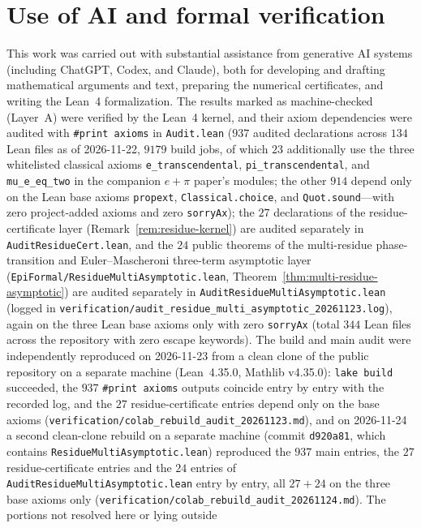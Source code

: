 \documentclass[11pt]{article}
\theoremstyle{definition}
\theoremstyle{remark}
\begin{document}
\section*{Use of AI and formal verification}
This work was carried out with substantial assistance from generative AI
systems (including ChatGPT, Codex, and Claude), both for developing and drafting
mathematical arguments and text, preparing the numerical certificates, and
writing the Lean~4 formalization. The results marked as machine-checked (Layer~A)
were verified by the Lean~4 kernel, and their axiom dependencies were audited
with \texttt{\#print axioms} in \texttt{Audit.lean} ($937$ audited declarations
across $134$ Lean files as of 2026-11-22, $9179$ build jobs, of which $23$ additionally use the three whitelisted classical
axioms \texttt{e\_transcendental}, \texttt{pi\_transcendental}, and
\texttt{mu\_e\_eq\_two} in the companion $e+\pi$ paper's modules; the other $914$
depend only on the Lean base axioms \texttt{propext}, \texttt{Classical.choice},
and \texttt{Quot.sound}---with zero
project-added axioms and zero \texttt{sorryAx}); the $27$ declarations of the
residue-certificate layer (Remark~\ref{rem:residue-kernel}) are audited separately in
\texttt{AuditResidueCert.lean}, and the $24$ public theorems of the multi-residue
phase-transition and Euler--Mascheroni three-term asymptotic layer
(\texttt{EpiFormal/\allowbreak ResidueMultiAsymptotic.lean},
Theorem~\ref{thm:multi-residue-asymptotic}) are audited separately in
\texttt{AuditResidueMultiAsymptotic.lean} (logged in
\texttt{verification/\allowbreak audit\_\allowbreak residue\_\allowbreak multi\_\allowbreak asymptotic\_\allowbreak 20261123.log}),
again on the three Lean base axioms only with zero \texttt{sorryAx} (total
$344$ Lean files across the repository with zero escape keywords). The build and main audit were independently reproduced on 2026-11-23 from a
clean clone of the public repository on a separate machine (Lean~4.35.0,
Mathlib v4.35.0): \texttt{lake build} succeeded, the $937$
\texttt{\#print axioms} outputs coincide entry by entry with the recorded log, and the $27$ residue-certificate entries depend only on the base axioms
(\texttt{verification/\allowbreak colab\_\allowbreak rebuild\_\allowbreak audit\_\allowbreak 20261123.md}), and on 2026-11-24 a second clean-clone rebuild on a separate machine (commit \texttt{d920a81}, which contains \texttt{ResidueMultiAsymptotic.lean}) reproduced the $937$ main entries, the $27$ residue-certificate entries and the $24$ entries of \texttt{AuditResidueMultiAsymptotic.lean} entry by entry, all $27+24$ on the three base axioms only (\texttt{verification/\allowbreak colab\_\allowbreak rebuild\_\allowbreak audit\_\allowbreak 20261124.md}). The portions not resolved here or lying outside
\end{document}

